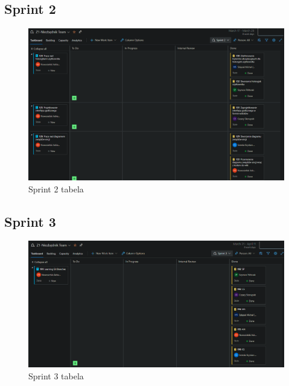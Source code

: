\documentclass[10pt, a4paper]{report}
\begin{document}
\subsection{Sprint 2}
\begin{figure}[ht]
    \begin{center}
        \includegraphics[scale=0.4]{s2.png}
        \caption{Sprint 2 tabela}
    \end{center}
\end{figure}
\newpage

\subsection{Sprint 3}
\begin{figure}[ht]
    \begin{center}
        \includegraphics[scale=0.38]{s3.png}
        \caption{Sprint 3 tabela}
    \end{center}
\end{figure}
\end{document}
